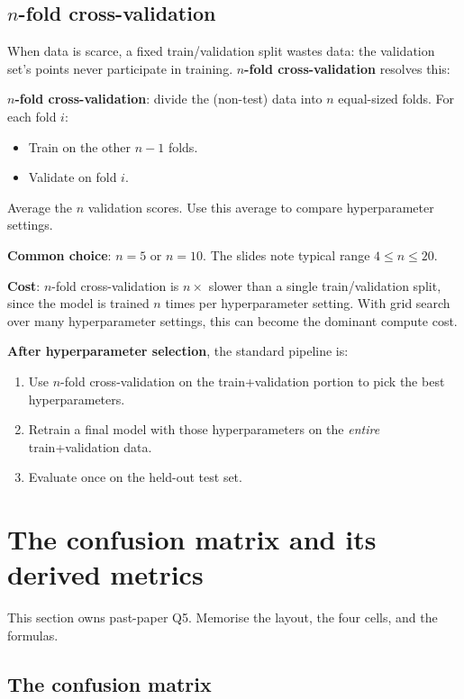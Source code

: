 \documentclass[11pt, a4paper]{article}
\begin{document}
\subsection{$n$-fold cross-validation}

When data is scarce, a fixed train/validation split wastes data: the validation set's points never participate in training. \textbf{$n$-fold cross-validation} resolves this:

\begin{defbox}
\textbf{$n$-fold cross-validation}: divide the (non-test) data into $n$ equal-sized folds. For each fold $i$:
\begin{itemize}
  \item Train on the other $n-1$ folds.
  \item Validate on fold $i$.
\end{itemize}
Average the $n$ validation scores. Use this average to compare hyperparameter settings.
\end{defbox}

\textbf{Common choice}: $n = 5$ or $n = 10$. The slides note typical range $4 \le n \le 20$.

\textbf{Cost}: $n$-fold cross-validation is $n \times$ slower than a single train/validation split, since the model is trained $n$ times per hyperparameter setting. With grid search over many hyperparameter settings, this can become the dominant compute cost.

\textbf{After hyperparameter selection}, the standard pipeline is:
\begin{enumerate}
  \item Use $n$-fold cross-validation on the train+validation portion to pick the best hyperparameters.
  \item Retrain a final model with those hyperparameters on the \emph{entire} train+validation data.
  \item Evaluate once on the held-out test set.
\end{enumerate}

\section{The confusion matrix and its derived metrics}

This section owns past-paper Q5. Memorise the layout, the four cells, and the formulas.

\subsection{The confusion matrix}
\end{document}
